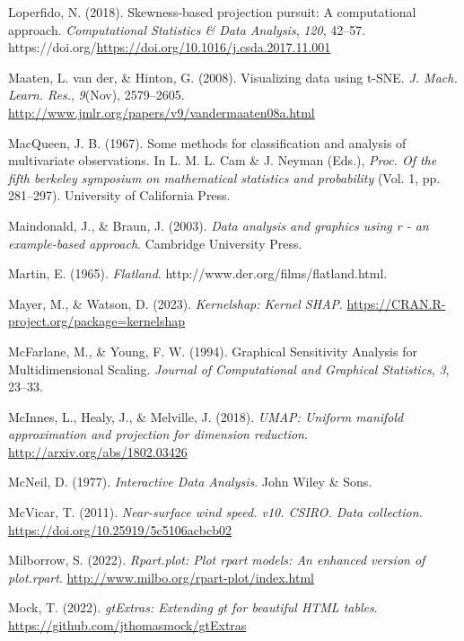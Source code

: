 \documentclass[
  letterpaper,
]{krantz}
\newlength{\cslhangindent}
\newenvironment{CSLReferences}[2] %
 {\begin{list}{}{%
  \setlength{\itemindent}{0pt}
  \setlength{\leftmargin}{0pt}
  \setlength{\parsep}{0pt}
  \ifodd #1
   \setlength{\leftmargin}{\cslhangindent}
   \setlength{\itemindent}{-1\cslhangindent}
  \fi
  \setlength{\itemsep}{#2\baselineskip}}}
 {\end{list}}
\begin{document}
\begin{CSLReferences}{1}{0}
Loperfido, N. (2018). Skewness-based projection pursuit: A computational
approach. \emph{Computational Statistics \& Data Analysis}, \emph{120},
42--57. https://doi.org/\url{https://doi.org/10.1016/j.csda.2017.11.001}

Maaten, L. van der, \& Hinton, G. (2008). Visualizing data using
{t-SNE}. \emph{J. Mach. Learn. Res.}, \emph{9}(Nov), 2579--2605.
\url{http://www.jmlr.org/papers/v9/vandermaaten08a.html}

MacQueen, J. B. (1967). Some methods for classification and analysis of
multivariate observations. In L. M. L. Cam \& J. Neyman (Eds.),
\emph{Proc. Of the fifth berkeley symposium on mathematical statistics
and probability} (Vol. 1, pp. 281--297). University of California Press.

Maindonald, J., \& Braun, J. (2003). \emph{Data analysis and graphics
using r - an example-based approach}. Cambridge University Press.

Martin, E. (1965). \emph{Flatland}.
http://www.der.org/films/flatland.html.

Mayer, M., \& Watson, D. (2023). \emph{Kernelshap: Kernel SHAP}.
\url{https://CRAN.R-project.org/package=kernelshap}

McFarlane, M., \& Young, F. W. (1994). Graphical {S}ensitivity
{A}nalysis for {M}ultidimensional {S}caling. \emph{Journal of
Computational and Graphical Statistics}, \emph{3}, 23--33.

McInnes, L., Healy, J., \& Melville, J. (2018). \emph{{UMAP}: Uniform
manifold approximation and projection for dimension reduction}.
\url{http://arxiv.org/abs/1802.03426}

McNeil, D. (1977). \emph{Interactive {D}ata {A}nalysis}. John Wiley \&
Sons.

McVicar, T. (2011). \emph{Near-surface wind speed. v10. CSIRO. Data
collection.} \url{https://doi.org/10.25919/5c5106acbcb02}

Milborrow, S. (2022). \emph{Rpart.plot: Plot rpart models: An enhanced
version of plot.rpart}. \url{http://www.milbo.org/rpart-plot/index.html}

Mock, T. (2022). \emph{gtExtras: Extending gt for beautiful HTML
tables}. \url{https://github.com/jthomasmock/gtExtras}


\end{CSLReferences}
\end{document}
